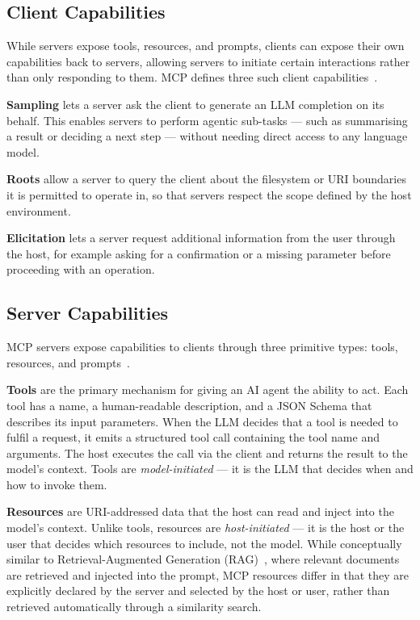 \documentclass[
  digital,     %
  oneside,     %
  nosansbold,  %
  nocolorbold, %
  lof,         %
  lot,         %
]{fithesis4}
\begin{document}
\subsection{Client Capabilities}
\label{subsec:mcp-client-capabilities}

While servers expose tools, resources, and prompts, clients can expose
their own capabilities back to servers, allowing servers to initiate
certain interactions rather than only responding to them.
MCP defines three such client capabilities~\parencite{mcp-spec}.

\textbf{Sampling} lets a server ask the client to generate an LLM
completion on its behalf. This enables servers to perform agentic
sub-tasks --- such as summarising a result or deciding a next step ---
without needing direct access to any language model.

\textbf{Roots} allow a server to query the client about the filesystem
or URI boundaries it is permitted to operate in, so that servers
respect the scope defined by the host environment.

\textbf{Elicitation} lets a server request additional information from
the user through the host, for example asking for a confirmation or a
missing parameter before proceeding with an operation.

\subsection{Server Capabilities}
\label{subsec:mcp-primitives}

MCP servers expose capabilities to clients through three primitive types:
tools, resources, and prompts~\parencite{mcp-spec}.

\textbf{Tools} are the primary mechanism for giving an AI agent the ability
to act. Each tool has a name, a human-readable description, and a JSON Schema
that describes its input parameters. When the LLM decides that a tool is
needed to fulfil a request, it emits a structured tool call containing the
tool name and arguments. The host executes the call via the client and
returns the result to the model's context. Tools are \textit{model-initiated}
--- it is the LLM that decides when and how to invoke them.

\textbf{Resources} are URI-addressed data that the host can read and inject
into the model's context. Unlike tools, resources are \textit{host-initiated} ---
it is the host or the user that decides which resources to include, not the
model. While conceptually similar to Retrieval-Augmented Generation
(RAG)~\parencite{lewis2020rag},
where relevant documents are retrieved and injected into the prompt, MCP
resources differ in that they are explicitly declared by the server and
selected by the host or user, rather than retrieved automatically through
a similarity search.
\end{document}
